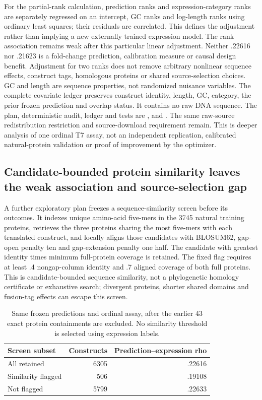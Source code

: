 For the partial-rank calculation, prediction ranks and expression-category ranks are separately regressed on an intercept, GC ranks and log-length ranks using ordinary least squares; their residuals are correlated. This defines the adjustment rather than implying a new externally trained expression model. The rank association remains weak after this particular linear adjustment. Neither .22616 nor .21623 is a fold-change prediction, calibration measure or causal design benefit. Adjustment for two ranks does not remove arbitrary nonlinear sequence effects, construct tags, homologous proteins or shared source-selection choices. GC and length are sequence properties, not randomized nuisance variables.
The complete covariate ledger preserves construct identity, length, GC, category, the prior frozen prediction and overlap status. It contains no raw DNA sequence. The plan, deterministic audit, ledger and tests are ,  and . The same raw-source redistribution restriction and source-download requirement remain. This is deeper analysis of one ordinal T7 assay, not an independent replication, calibrated natural-protein validation or proof of improvement by the optimizer.

\subsection{Candidate-bounded protein similarity leaves the weak association and source-selection gap}
A further exploratory plan freezes a sequence-similarity screen before its outcomes. It indexes unique amino-acid five-mers in the 3745 natural training proteins, retrieves the three proteins sharing the most five-mers with each translated construct, and locally aligns those candidates with BLOSUM62, gap-open penalty ten and gap-extension penalty one half. The candidate with greatest identity times minimum full-protein coverage is retained. The fixed flag requires at least .4 nongap-column identity and .7 aligned coverage of both full proteins. This is candidate-bounded sequence similarity, not a phylogenetic homology certificate or exhaustive search; divergent proteins, shorter shared domains and fusion-tag effects can escape this screen.
\begin{table}[!ht]\centering
\caption{Same frozen predictions and ordinal assay, after the earlier 43 exact protein containments are excluded. No similarity threshold is selected using expression labels.}
\begin{tabular}{lrr}\hline
Screen subset & Constructs & Prediction--expression rho\\\hline
All retained &6305&.22616\\
Similarity flagged &506&.19108\\
Not flagged &5799&.22633\\\hline
\end{tabular}\end{table}


